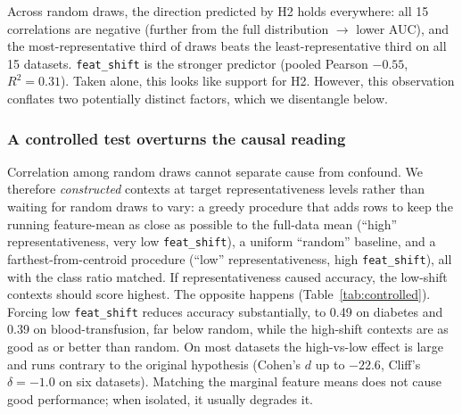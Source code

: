 \documentclass{article}
\begin{document}
Across random draws, the direction predicted by H2 holds everywhere: all 15 correlations are negative (further from the full distribution $\rightarrow$ lower AUC), and the most-representative third of draws beats the least-representative third on all 15 datasets. \texttt{feat\_shift} is the stronger predictor (pooled Pearson $-0.55$, $R^2=0.31$). Taken alone, this looks like support for H2. However, this observation conflates two potentially distinct factors, which we disentangle below.

\subsubsection*{A controlled test overturns the causal reading}

Correlation among random draws cannot separate cause from confound. We therefore \emph{constructed} contexts at target representativeness levels rather than waiting for random draws to vary: a greedy procedure that adds rows to keep the running feature-mean as close as possible to the full-data mean (``high'' representativeness, very low \texttt{feat\_shift}), a uniform ``random'' baseline, and a farthest-from-centroid procedure (``low'' representativeness, high \texttt{feat\_shift}), all with the class ratio matched. If representativeness caused accuracy, the low-shift contexts should score highest. The opposite happens (Table~\ref{tab:controlled}). Forcing low \texttt{feat\_shift} reduces accuracy substantially, to 0.49 on diabetes and 0.39 on blood-transfusion, far below random, while the high-shift contexts are as good as or better than random. On most datasets the high-vs-low effect is large and runs contrary to the original hypothesis (Cohen's $d$ up to $-22.6$, Cliff's $\delta=-1.0$ on six datasets). Matching the marginal feature means does not cause good performance; when isolated, it usually degrades it.
\end{document}
